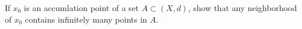 If $x_0$ is an accumlation point of a set $A\subset(X,d)$, show that any neighborhood of $x_0$ contains
infinitely many points in $A$.\\